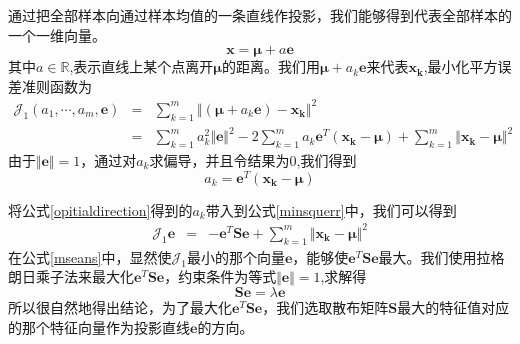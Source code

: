\documentclass[12pt,a4paper,CJK]{beamer}
\begin{document}
\begin{CJK*}{UTF8}{gkai}
\begin{frame}{\subsecname}
通过把全部样本向通过样本均值的一条直线作投影，我们能够得到代表全部样本的一个一维向量。
\begin{equation}
\label{direction}
\boldsymbol{x}=\boldsymbol{\mu}+a\boldsymbol{e}
\end{equation}
其中$a\in\mathbb{R}$,表示直线上某个点离开$\boldsymbol{\mu}$的距离。我们用$\boldsymbol{\mu}+a_k\boldsymbol{e}$来代表$\boldsymbol{x_k}$,最小化平方误差准则函数为
\begin{eqnarray}
\label{minsquerr}
\mathcal{J}_1(a_1,\cdots,a_m,\boldsymbol{e})\nonumber
&=&\sum_{k=1}^{m}\Vert(\boldsymbol{\mu}+a_k\boldsymbol{e})-\boldsymbol{x_k}\Vert^2\\
&=&\sum_{k=1}^{m}a_k^2\Vert\boldsymbol{e}\Vert^2-
2\sum_{k=1}^{m}a_k\boldsymbol{e}^T(\boldsymbol{x_k}-\boldsymbol{\mu})+
\sum_{k=1}^{m}\Vert\boldsymbol{x_k}-\boldsymbol{\mu}\Vert^2 
\end{eqnarray}
由于$\Vert\boldsymbol{e}\Vert=1$，通过对$a_k$求偏导，并且令结果为0,我们得到
\begin{equation}
\label{opitialdirection}
a_k=\boldsymbol{e}^T(\boldsymbol{x_k}-\boldsymbol{\mu})
\end{equation}
\end{frame}


\begin{frame}{\subsecname}
将公式\ref{opitialdirection}得到的$a_k$带入到公式\ref{minsquerr}中，我们可以得到
\begin{eqnarray}
\label{mseans}
\mathcal{J}_1{\boldsymbol{e}}
&=&-\boldsymbol{e}^T\mathbf{S}\boldsymbol{e}
+\sum_{k=1}^{m}\Vert\boldsymbol{x_k}-\boldsymbol{\mu}\Vert^2 
\end{eqnarray}
在公式\ref{mseans}中，显然使$\mathcal{J}_1$最小的那个向量$\boldsymbol{e}$，能够使$\boldsymbol{e}^T\mathbf{S}\boldsymbol{e}$最大。我们使用拉格朗日乘子法来最大化$\boldsymbol{e}^T\mathbf{S}\boldsymbol{e}$，约束条件为等式$\Vert\boldsymbol{e}\Vert=1$,求解得
\begin{equation}
\label{pacans}
\mathbf{S}\boldsymbol{e}=\lambda\boldsymbol{e}
\end{equation}
所以很自然地得出结论，为了最大化$\boldsymbol{e}^T\mathbf{S}\boldsymbol{e}$，我们选取散布矩阵$\mathbf{S}$最大的特征值对应的那个特征向量作为投影直线$\boldsymbol{e}$的方向。
\end{frame}



\end{CJK*}
\end{document}
